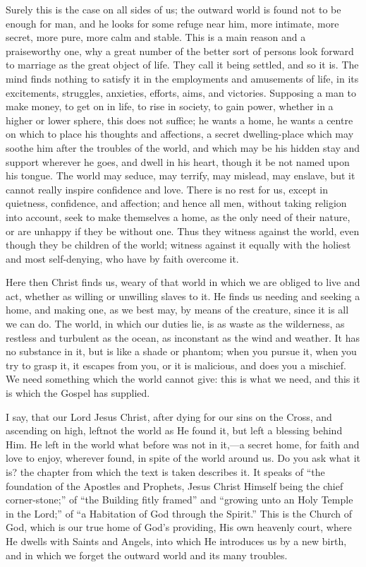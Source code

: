 Surely this is the case on all sides of us; the outward world is
found not to be enough for man, and he looks for some refuge near him,
more intimate, more secret, more pure, more calm and stable. This is a
main reason and a praiseworthy one, why a great number of the better
sort of persons look forward to marriage as the great object of life.
They call it being settled, and so it is. The mind finds nothing to
satisfy it in the employments and amusements of life, in its
excitements, struggles, anxieties, efforts, aims, and victories.
Supposing a man to make money, to get on in life, to rise in society,
to gain power, whether in a higher or lower sphere, this does not
suffice; he wants a home, he wants a centre on which to place his
thoughts and affections, a secret dwelling-place which may soothe him
after the troubles of the world, and which may be his hidden stay and
support wherever he goes, and dwell in his heart, though it be not
named upon his tongue. The world may seduce, may terrify, may mislead,
may enslave, but it cannot really inspire confidence and love. There
is no rest for us, except in quietness, confidence, and affection; and
hence all men, without taking religion into account, seek to make
themselves a home, as the only need of their nature, or are unhappy if
they be without one. Thus they witness against the world, even though
they be children of the world; witness against it equally with the
holiest and most self-denying, who have by faith overcome it.

Here then Christ finds us, weary of that world in which we are
obliged to live and act, whether as willing or unwilling slaves to it.
He finds us needing and seeking a home, and making one, as we best
may, by means of the creature, since it is all we can do. The world,
in which our duties lie, is as waste as the wilderness, as restless
and turbulent as the ocean, as inconstant as the wind and weather. It
has no substance in it, but is like a shade or phantom; when you
pursue it, when you try to grasp it, it escapes from you, or it is
malicious, and does you a mischief. We need something which the world
cannot give: this is what we need, and this it is which the Gospel has
supplied.

I say, that our Lord Jesus Christ, after dying for our sins on the
Cross, and ascending on high, left\emph{}not the world as He found
it, but left a blessing behind Him. He left in the world what before
was not in it,—a secret home, for faith and love to enjoy, wherever
found, in spite of the world around us. Do you ask what it is? the
chapter from which the text is taken describes it. It speaks of
``the foundation of the Apostles and Prophets, Jesus Christ
Himself being the chief corner-stone;'' of ``the Building
fitly framed'' and ``growing unto an Holy Temple in the
Lord;'' of ``a Habitation of God through the Spirit.''
This is the Church of God, which is our true home of God's providing,
His own heavenly court, where He dwells with Saints and Angels, into
which He introduces us by a new birth, and in which we forget the
outward world and its many troubles.

